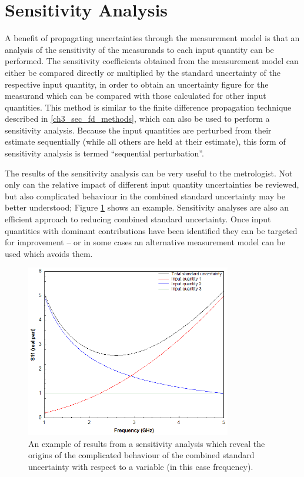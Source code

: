 \documentclass[../thesis/thesis.tex]{subfiles}
\begin{document}
\section{Sensitivity Analysis}

A benefit of propagating uncertainties through the measurement model is that an analysis of the sensitivity of the measurands to each input quantity can be performed. The sensitivity coefficients obtained from the measurement model can either be compared directly or multiplied by the standard uncertainty of the respective input quantity, in order to obtain an uncertainty figure for the measurand which can be compared with those calculated for other input quantities. This method is similar to the finite difference propagation technique described in \ref{ch3_sec_fd_methods}, which can also be used to perform a sensitivity analysis. Because the input quantities are perturbed from their estimate sequentially (while all others are held at their estimate), this form of sensitivity analysis is termed ``sequential perturbation''.

The results of the sensitivity analysis can be very useful to the metrologist. Not only can the relative impact of different input quantity uncertainties be reviewed, but also complicated behaviour in the combined standard uncertainty may be better understood; Figure \ref{ch3_fig_sensitivity} shows an example. Sensitivity analyses are also an efficient approach to reducing combined standard uncertainty. Once input quantities with dominant contributions have been identified they can be targeted for improvement – or in some cases an alternative measurement model can be used which avoids them.

\begin{figure}[h!]
	\centering
	\includegraphics[width=0.8\textwidth]{sensitivity}
	\caption[Sensitivity analysis example results.]{An example of results from a sensitivity analysis which reveal the origins of the complicated behaviour of the combined standard uncertainty with respect to a variable (in this case frequency).}
	\label{ch3_fig_sensitivity}
\end{figure}
\end{document}
